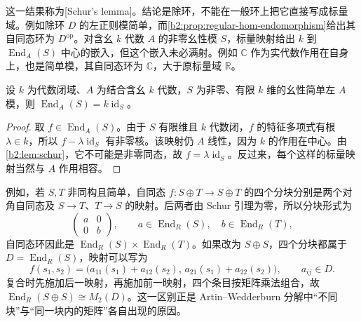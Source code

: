 这一结果称为[Schur's lemma]。结论是除环，不能在一般环上把它直接写成标量域。例如除环 \(D\) 的左正则模简单，而\cref{b2:prop:regular-hom-endomorphism}给出其自同态环为 \(D^{\mathrm{op}}\)。对含幺 \(k\) 代数 \(A\) 的非零幺性模 \(S\)，标量映射给出 \(k\) 到 \(\operatorname{End}_A(S)\) 中心的嵌入，但这个嵌入未必满射。例如 \(\mathbb C\) 作为实代数作用在自身上，也是简单模，其自同态环为 \(\mathbb C\)，大于原标量域 \(\mathbb R\)。

\begin{corollary}\label{b2:cor:schur-algebraically-closed}
	设 \(k\) 为代数闭域、\(A\) 为结合含幺 \(k\) 代数，\(S\) 为非零、有限 \(k\) 维的幺性简单左 \(A\) 模，则 \(\operatorname{End}_A(S)=k\operatorname{id}_S\)。
\end{corollary}
\begin{proof}
	取 \(f\in\operatorname{End}_A(S)\)。由于 \(S\) 有限维且 \(k\) 代数闭，\(f\) 的特征多项式有根 \(\lambda\in k\)，所以 \(f-\lambda\operatorname{id}_S\) 有非零核。该映射仍 \(A\) 线性，因为 \(k\) 的作用在中心。由\cref{b2:lem:schur}，它不可能是非零同态，故 \(f=\lambda\operatorname{id}_S\)。反过来，每个这样的标量映射当然与 \(A\) 作用相容。
\end{proof}

例如，若 \(S,T\) 非同构且简单，自同态 \(f:S\oplus T\to S\oplus T\) 的四个分块分别是两个对角自同态及 \(S\to T\)、\(T\to S\) 的映射。后两者由 Schur 引理为零，所以分块形式为
\[
	\begin{pmatrix}a&0\\0&b\end{pmatrix},\qquad
	a\in\operatorname{End}_R(S),\quad b\in\operatorname{End}_R(T),
\]
自同态环因此是 \(\operatorname{End}_R(S)\times\operatorname{End}_R(T)\)。如果改为 \(S\oplus S\)，四个分块都属于 \(D=\operatorname{End}_R(S)\)，映射可以写为
\[
	f(s_1,s_2)=\bigl(a_{11}(s_1)+a_{12}(s_2),\, a_{21}(s_1)+a_{22}(s_2)\bigr),\qquad a_{ij}\in D.
\]
复合时先施加后一映射，再施加前一映射，四个条目按矩阵乘法组合，故 \(\operatorname{End}_R(S\oplus S)\cong M_2(D)\)。这一区别正是 Artin–Wedderburn 分解中“不同块”与“同一块内的矩阵”各自出现的原因。

